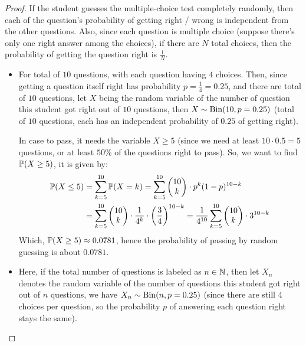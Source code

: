 \documentclass{article}
\begin{document}
\begin{proof}
    If the student guesses the multiple-choice test completely randomly, then each of the question's probability of getting right / wrong is independent from the other questions. Also, since each question is multiple choice (suppose there's only one right answer among the choices), if there are $N$ total choices, then the probability of getting the question right is $\frac{1}{N}$.

    \begin{itemize}
        \item[a)] For total of $10$ questions, with each question having $4$ choices. Then, since getting a question itself right has probability $p=\frac{1}{4}=0.25$, and there are total of $10$ questions, let $X$ being the random variable of the number of question this student got right out of $10$ questions, then $X \sim \mathrm{Bin}(10, p=0.25)$ (total of $10$ questions, each has an independent probability of $0.25$ of getting right).
        
        In case to pass, it needs the variable $X\geq 5$ (since we need at least $10 \cdot 0.5 = 5$ questions, or at least $50\%$ of the questions right to pass). So, we want to find $\mathbb{P}(X\geq 5)$, it is given by:
        \begin{align}
            \mathbb{P}(X\leq 5) &= \sum_{k=5}^{10}\mathbb{P}(X=k)=\sum_{k=5}^{10}\begin{pmatrix}10\\k\end{pmatrix} \cdot p^k (1-p)^{10-k}\\ 
            &= \sum_{k=5}^{10}\begin{pmatrix}10\\k\end{pmatrix} \cdot \frac{1}{4^k}\cdot \left(\frac{3}{4}\right)^{10-k} = \frac{1}{4^{10}}\sum_{k=5}^{10}\begin{pmatrix}10\\k\end{pmatrix} \cdot 3^{10-k}
        \end{align}
        Which, $\mathbb{P}(X\geq 5) \approx 0.0781$, hence the probability of passing by random guessing is about $0.0781$.

        \hfil

        \item[b)] Here, if the total number of questions is labeled as $n\in\mathbb{N}$, then let $X_n$ denotes the random variable of the number of questions this student got right out of $n$ questions, we have $X_n\sim \mathrm{Bin}(n, p=0.25)$ (since there are still 4 choices per question, so the probability $p$ of answering each question right stays the same). 
        

\end{itemize}
\end{proof}
\end{document}
